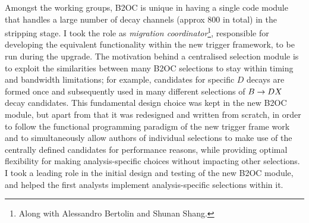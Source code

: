 Amongst the working groups, B2OC is unique in having a single code module that handles a large number of decay channels (approx 800 in total) in the stripping stage. I took the role as \emph{migration coordinator}\footnote{Along with Alessandro Bertolin and Shunan Shang.}, responsible for developing the equivalent functionality within the new trigger framework, to be run during the \lhcb upgrade. The motivation behind a centralised selection module is to exploit the similarities between many B2OC selections to stay within timing and bandwidth limitations; for example, candidates for specific $D$ decays are formed once and subsequently used in many different selections of ${B}\rightarrow{\ensuremath{D}} X$ decay candidates. This fundamental design choice was kept in the new B2OC module, but apart from that it was redesigned and written from scratch, in order to follow the functional programming paradigm of the new trigger frame work and to simultaneously allow authors of individual selections to make use of the centrally defined candidates for performance reasons, while providing optimal flexibility for making analysis-specific choices without impacting other selections. I took a leading role in the initial design and testing of the new B2OC module, and helped the first analysts implement analysis-specific selections within it.


